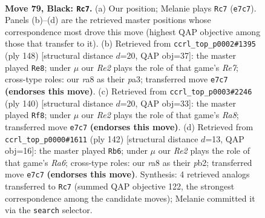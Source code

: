 \documentclass[11pt]{article}
\begin{document}
\clearpage

\begin{figure}[p]\centering
\begin{subfigure}{0.46\textwidth}\centering
\resizebox{\linewidth}{!}{%
\newchessgame
\chessboard[
  setfen={R7/4rp2/1R2p2k/8/P3P2K/5P2/8/8 b - - 50 79},
  showmover=false,
  pgfstyle=straightmove, color=movearrow, markmove={e7-c7}
]}
\caption{}
\end{subfigure}\hfill
\begin{subfigure}{0.46\textwidth}\centering
\resizebox{\linewidth}{!}{%
\newchessgame
\chessboard[
  setfen={8/4R3/1kp5/8/3PP3/p5K1/4r2P/8 w - - 11 75},
  showmover=false,
  pgfstyle=straightmove, color=movearrow, markmove={e7-e8}
]}
\caption{}
\end{subfigure}
\\[4pt]
\begin{subfigure}{0.46\textwidth}\centering
\resizebox{\linewidth}{!}{%
\newchessgame
\chessboard[
  setfen={R7/8/P5k1/1K3p2/6p1/1P6/r7/8 w - - 0 71},
  showmover=false,
  pgfstyle=straightmove, color=movearrow, markmove={a8-f8}
]}
\caption{}
\end{subfigure}\hfill
\begin{subfigure}{0.46\textwidth}\centering
\resizebox{\linewidth}{!}{%
\newchessgame
\chessboard[
  setfen={5k2/8/R3Pr1p/3p4/3P4/2P3K1/1p6/8 w - - 0 72},
  showmover=false,
  pgfstyle=straightmove, color=movearrow, markmove={a6-b6}
]}
\caption{}
\end{subfigure}
\caption{\textbf{Move 79, Black: \texttt{Rc7}.} (a) Our position; Melanie plays \texttt{Rc7} (\texttt{e7c7}). Panels (b)--(d) are the retrieved master positions whose correspondence most drove this move (highest QAP objective among those that transfer to it). (b) Retrieved from \texttt{ccrl\_top\_p0002\#1395} (ply 148) [structural distance $d$=20, QAP obj=37]: the master played \texttt{Re8}; under $\mu$ our \emph{Re2} plays the role of that game's \emph{Re7}; cross-type roles: our \emph{r}a8 as their \emph{p}a3; transferred move \texttt{e7c7} \textbf{(endorses this move)}. (c) Retrieved from \texttt{ccrl\_top\_p0003\#2246} (ply 140) [structural distance $d$=20, QAP obj=33]: the master played \texttt{Rf8}; under $\mu$ our \emph{Re2} plays the role of that game's \emph{Ra8}; transferred move \texttt{e7c7} \textbf{(endorses this move)}. (d) Retrieved from \texttt{ccrl\_top\_p0000\#1611} (ply 142) [structural distance $d$=13, QAP obj=16]: the master played \texttt{Rb6}; under $\mu$ our \emph{Re2} plays the role of that game's \emph{Ra6}; cross-type roles: our \emph{r}a8 as their \emph{p}b2; transferred move \texttt{e7c7} \textbf{(endorses this move)}. Synthesis: 4 retrieved analogs transferred to \texttt{Rc7} (summed QAP objective 122, the strongest correspondence among the candidate moves); Melanie committed it via the \texttt{search} selector.}
\label{fig:thought-m157}
\end{figure}
\end{document}
